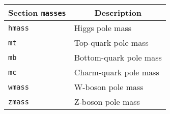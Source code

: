 	\begin{longtable}{p{1.5cm}p{12cm}}
		\hline
		\multicolumn{1}{c}{{\textbf{Section} \texttt{masses}}} & \multicolumn{1}{c}{{\textbf{Description}}} \\ 
		\hline
		\texttt{hmass} & Higgs pole mass \\
		\texttt{mt} & Top-quark pole mass \\
		\texttt{mb} & Bottom-quark pole mass \\
		\texttt{mc} & Charm-quark pole mass \\
		\texttt{wmass} & W-boson pole mass \\
		\texttt{zmass} & Z-boson pole mass \\
		\hline
	\end{longtable}
